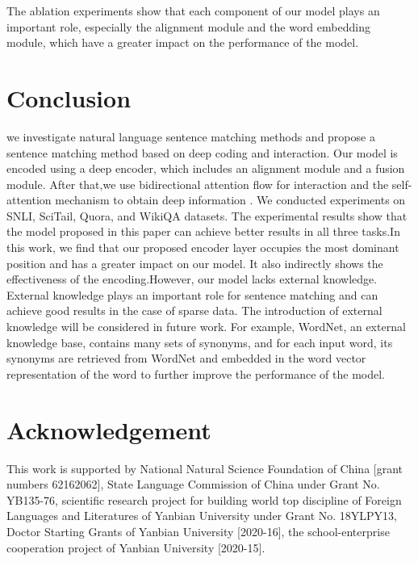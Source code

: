 \documentclass[review]{elsarticle}
\begin{document}
The ablation experiments show that each component of our model plays an important role, especially the alignment module and the word embedding module, which have a greater impact on the performance of the model.
\section{Conclusion}
we investigate natural language sentence matching methods and propose a sentence matching method based on deep coding and interaction. Our model is encoded using a deep encoder, which includes an alignment module and a fusion module. After that,we use bidirectional attention flow for interaction  and  the self-attention mechanism  to obtain deep information . We conducted experiments on SNLI, SciTail, Quora, and WikiQA datasets. The experimental results show that the model proposed in this paper can achieve better results in all three tasks.In this work, we find that our proposed encoder layer occupies the most dominant position and has a greater impact on our model. It also indirectly shows the effectiveness of the encoding.However, 
our model lacks external knowledge. External knowledge plays an important role for sentence matching and can achieve good results in the case of sparse data. The introduction of external knowledge will be considered in future work. For example, WordNet, an external knowledge base, contains many sets of synonyms, and for each input word, its synonyms are retrieved from WordNet and embedded in the word vector representation of the word to further improve the performance of the model.
\section*{Acknowledgement}
This work is supported by National Natural Science Foundation of China [grant numbers 62162062], State Language Commission of China under Grant No. YB135-76, scientific research project for building world top discipline of Foreign Languages and Literatures of Yanbian University under Grant No. 18YLPY13, Doctor Starting Grants of Yanbian University [2020-16], the school-enterprise cooperation project of Yanbian University [2020-15].
\end{document}
